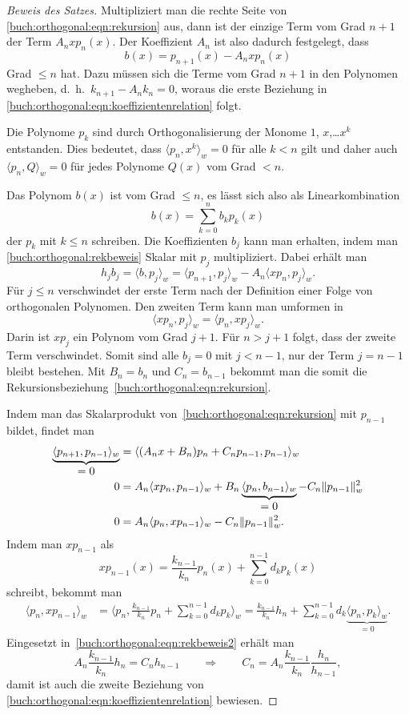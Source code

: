 \begin{proof}[Beweis des Satzes]
Multipliziert man die rechte Seite von
\eqref{buch:orthogonal:eqn:rekursion} aus, dann ist der einzige Term
vom Grad $n+1$ der Term $A_nxp_n(x)$.
Der Koeffizient $A_n$ ist also dadurch festgelegt, dass
\begin{equation}
b(x)
=
p_{n+1}(x) - A_nxp_n(x)
\label{buch:orthogonal:rekbeweis}
\end{equation}
Grad $\le n$ hat.
Dazu müssen sich die Terme vom Grad $n+1$ in den Polynomen wegheben,
d.~h.~$k_{n+1}-A_nk_n=0$, woraus die erste Beziehung in
\eqref{buch:orthogonal:eqn:koeffizientenrelation} folgt.

Die Polynome $p_k$ sind durch Orthogonalisierung der Monome
$1$, $x$,\dots $x^{k}$ entstanden.
Dies bedeutet, dass $\langle p_n,x^k\rangle_w=0$ für alle $k<n$
gilt und daher auch $\langle p_n,Q\rangle_w=0$ für jedes Polynome
$Q(x)$ vom Grad $<n$.

Das Polynom $b(x)$ ist vom Grad $\le n$, es lässt sich also als
Linearkombination
\[
b(x) = \sum_{k=0}^n b_k p_k(x)
\]
der $p_k$ mit $k\le n$ schreiben.
Die Koeffizienten $b_j$ kann man erhalten, indem man 
\eqref{buch:orthogonal:rekbeweis} Skalar mit $p_j$ multipliziert.
Dabei erhält man
\[
h_jb_j
=
\langle b,p_j\rangle_w
=
\langle p_{n+1},p_j\rangle_w
-
A_n\langle xp_n,p_j\rangle_w.
\]
Für $j\le n$ verschwindet der erste Term nach der Definition einer
Folge von orthogonalen Polynomen.
Den zweiten Term kann man umformen in
\[
\langle xp_n,p_j\rangle_w
=
\langle p_n,xp_j\rangle_w.
\]
Darin ist $xp_j$ ein Polynom vom Grad $j+1$.
Für $n>j+1$ folgt, dass der zweite Term verschwindet.
Somit sind alle $b_j=0$ mit $j<n-1$, nur der Term $j=n-1$
bleibt bestehen.
Mit $B_n=b_n$ und $C_n=b_{n-1}$ bekommt man die somit die
Rekursionsbeziehung~\eqref{buch:orthogonal:eqn:rekursion}.

Indem man das Skalarprodukt von~\eqref{buch:orthogonal:eqn:rekursion}
mit $p_{n-1}$ bildet, findet man
\begin{align}
\underbrace{\langle
p_{n+1},p_{n-1}
\rangle_w}_{\displaystyle=0}
&=
\langle (A_nx+B_n)p_n+C_np_{n-1},p_{n-1} \rangle_w
\notag
\\
0
&=
A_n\langle xp_n,p_{n-1} \rangle_w
+B_n\underbrace{\langle p_n,b_{n-1}\rangle_w}_{\displaystyle=0}
-C_n\|p_{n-1}\|_w^2
\notag
\\
0
&=
A_n\langle p_n,xp_{n-1} \rangle_w
-C_n\|p_{n-1}\|_w^2.
\label{buch:orthogonal:eqn:rekbeweis2}
\end{align}
Indem man $xp_{n-1}$ als
\[
xp_{n-1}(x)
=
\frac{k_{n-1}}{k_n} p_n(x)
+
\sum_{k=0}^{n-1} d_kp_k(x)
\]
schreibt, bekommt man
\begin{align*}
\langle
p_n,
xp_{n-1}
\rangle_w
&=
\biggl\langle
p_n,
\frac{k_{n-1}}{k_n} p_n
+
\sum_{k=0}^{n-1} d_kp_k
\biggr\rangle_w
=
\frac{k_{n-1}}{k_n}h_n
+
\sum_{k=0}^{n-1} d_k\underbrace{\langle p_n,p_k\rangle_w}_{\displaystyle=0}.
\end{align*}
Eingesetzt in~\eqref{buch:orthogonal:eqn:rekbeweis2} erhält man
\[
A_n\frac{k_{n-1}}{k_n}h_n = C_n h_{n-1}
\qquad\Rightarrow\qquad
C_n
=
A_n\frac{k_{n-1}}{k_n}\frac{h_n}{h_{n-1}},
\]
damit ist auch die zweite Beziehung von
\eqref{buch:orthogonal:eqn:koeffizientenrelation}
bewiesen.
\end{proof}
